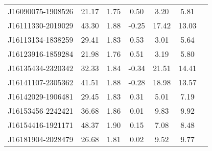 \begin{longtable}{lcccccc}
J16090075-1908526 &           21.17 &             1.75 &   0.50 &          3.20 &             5.81 \\
J16111330-2019029 &           43.30 &             1.88 &  -0.25 &         17.42 &            13.03 \\
J16113134-1838259 &           29.41 &             1.83 &   0.53 &          3.01 &             5.64 \\
J16123916-1859284 &           21.98 &             1.76 &   0.51 &          3.19 &             5.80 \\
J16135434-2320342 &           32.33 &             1.84 &  -0.34 &         21.51 &            14.41 \\
J16141107-2305362 &           41.51 &             1.88 &  -0.28 &         18.98 &            13.57 \\
J16142029-1906481 &           29.45 &             1.83 &   0.31 &          5.01 &             7.19 \\
J16153456-2242421 &           36.68 &             1.86 &   0.01 &          9.83 &             9.92 \\
J16154416-1921171 &           48.37 &             1.90 &   0.15 &          7.08 &             8.48 \\
J16181904-2028479 &           26.68 &             1.81 &   0.02 &          9.52 &             9.77 \\
\end{longtable}
